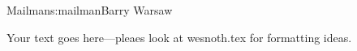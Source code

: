\begin{aosachapter}{Mailman}{s:mailman}{Barry Warsaw}

Your text goes here---pleaes look at wesnoth.tex for formatting ideas.

\end{aosachapter}
